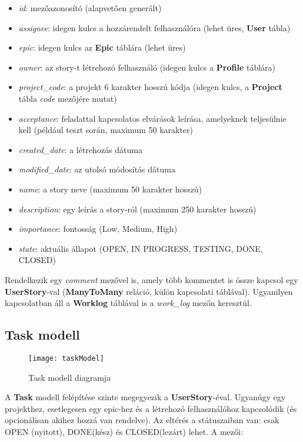 \begin{itemize}
	\item \textit{id}: mezőazonosító (alapvetően generált)
	\item \textit{assignee}: idegen kulcs a hozzárendelt felhasználóra (lehet üres, \textbf{User} tábla)
	\item \textit{epic}: idegen kulcs az \textbf{Epic} táblára (lehet üres)
	\item \textit{owner}: az story-t létrehozó felhasználó (idegen kulcs a \textbf{Profile} táblára)
	\item \textit{project\_code}: a projekt 6 karakter hosszú kódja (idegen kulcs, a \textbf{Project} tábla \textit{code} mezőjére mutat)
	\item \textit{acceptance}: feladattal kapcsolatos elvárások leírása, amelyeknek teljesülnie kell (például teszt során, maximum 50 karakter)
	\item \textit{created\_date}: a létrehozás dátuma
	\item \textit{modified\_date}: az utolsó módosítás dátuma
	\item \textit{name}: a story neve (maximum 50 karakter hosszú)
	\item \textit{description}: egy leírás a story-ról (maximum 250 karakter hosszú)
	\item \textit{importance}: fontosság (Low, Medium, High)
	\item \textit{state}: aktuális állapot (OPEN, IN PROGRESS, TESTING, DONE, CLOSED)
\end{itemize}

Rendelkezik egy \textit{comment} mezővel is, amely több kommentet is össze kapcsol egy \textbf{UserStory}-val (\textbf{ManyToMany} reláció, külön kapcsolati táblával). Ugyanilyen kapcsolatban áll a \textbf{Worklog} táblával is a \textit{work\_log} mezőn keresztül.

\subsection{Task modell}

\begin{figure}[H]
	\centering
	\texttt{[image: taskModel]}
	\caption{Task modell diagramja}
	\label{fig:taskmodel}
\end{figure}

A \textbf{Task} modell felépítése szinte megegyezik a \textbf{UserStory}-éval. Ugyanúgy egy projekthez, esetlegesen egy epic-hez és a létrehozó felhasználóhoz kapcsolódik (és opcionálisan akihez hozzá van rendelve). Az eltérés a státuszaiban van: csak OPEN (nyitott), DONE(kész) és CLOSED(lezárt) lehet. A mezői:

